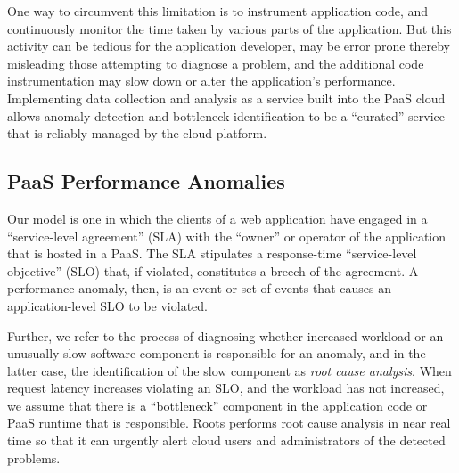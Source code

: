 One way to circumvent this 
limitation is to instrument application code, and continuously monitor the time taken by various
parts of the application. But this activity can be tedious for the application developer, 
may be error prone thereby misleading those attempting to
diagnose a problem, and
the additional code instrumentation may slow down or alter the application's
performance. 
Implementing data collection and analysis as a service built into the PaaS cloud allows 
anomaly detection and bottleneck identification to be a ``curated'' service that is 
reliably managed by the cloud platform.

\subsection{PaaS Performance Anomalies}


Our model is
one in which the clients of a web application have engaged in a
``service-level agreement'' (SLA)
with the ``owner'' or operator of the application that is hosted in a PaaS.  The SLA
stipulates a response-time ``service-level objective'' (SLO) that, if violated, constitutes a breech of the
agreement.  A performance anomaly, then, is an event or set of events that
causes an application-level SLO to be violated.

Further, we refer to the process
of diagnosing whether increased workload or an unusually slow software component is responsible for
an anomaly, and in the latter case, the identification of the slow component
as \textit{root cause analysis}.  When request latency increases violating an SLO,
and the workload has not increased, we assume that there is a ``bottleneck''
component in the application code or PaaS runtime that is responsible.  Roots
performs root cause analysis in near real time so
that it can urgently alert cloud users and administrators of the detected problems.

